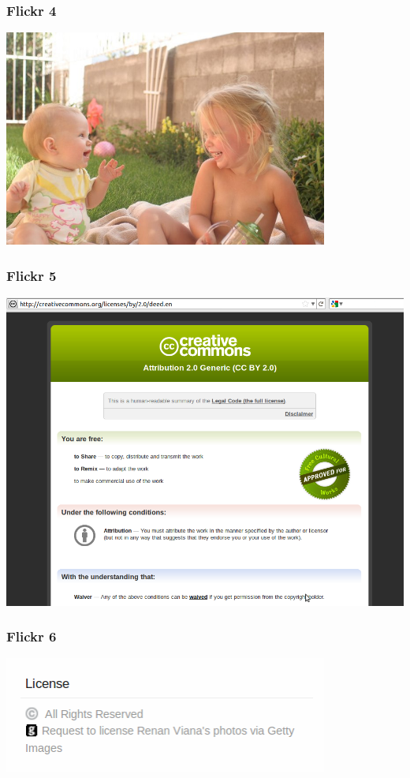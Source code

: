 \documentclass[mathserif,xcolor=dvipsnames,handout]{beamer}
\begin{document}
    \begin{frame}[t]
        \frametitle{Flickr 4}
        \begin{center}
            \includegraphics[width=0.8\textwidth]{katherine-and-evelyn.jpg}
        \end{center}
    \end{frame}
    \begin{frame}[t]
        \frametitle{Flickr 5}
        \begin{center}
            \includegraphics[height=0.8\textheight]{link-to-cc-license-from-flickr.png}
        \end{center}
    \end{frame}
    \begin{frame}[t]
        \frametitle{Flickr 6}
        \begin{center}
            \includegraphics[width=0.8\textwidth]{request-to-license1.png}
        \end{center}
    \end{frame}
\end{document}
